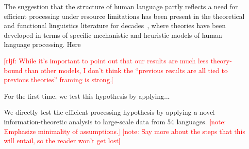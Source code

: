 \documentclass[12pt]{article}
\newcommand{\jd}[1]{\textcolor{Red}{[jd: #1]}}
\newcommand{\note}[1]{\textcolor{Red}{[note: #1]}}
\newcommand{\rljf}[1]{\textcolor{Red}{[rljf: #1]}}
\begin{document}
The suggestion that the structure of human language partly reflects a need for efficient processing under resource limitations has been present in the theoretical and functional linguistics literature for decades~\cite{berwick1984grammatical,hawkins1994performance}, where theories have been developed in terms of specific mechanistic and heuristic models of human language processing.
Here 


\rljf{While it's important to point out that our results are much less theory-bound than other models, I don't think the ``previous results are all tied to previous theories'' framing is strong.}




For the first time, we test this hypothesis by applying...

We directly test the efficient processing hypothesis by applying a novel information-theoretic analysis to large-scale data from 54 languages.
\note{Emphasize minimality of assumptions.}
\note{Say more about the steps that this will entail, so the reader won't get lost}


\end{document}
